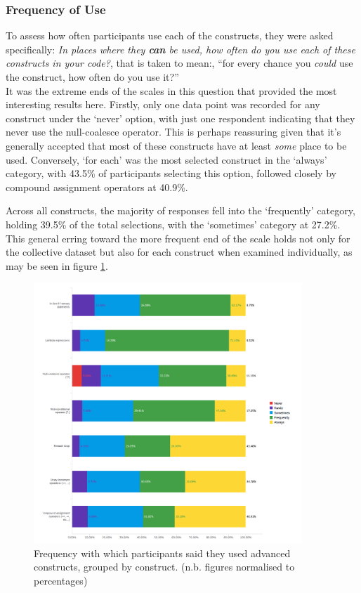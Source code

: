 \documentclass{article}
\begin{document}
        \subsubsection{Frequency of Use}
            To assess how often participants use each of the constructs, they were asked specifically: \textit{In places where they \textbf{can} be used, how often do you use each of these constructs in your code?}, that is taken to mean:, ``for every chance you \emph{could} use the construct, how often do you use it?''
            \\\newline
            It was the extreme ends of the scales in this question that provided the most interesting results here. Firstly, only one data point was recorded for any construct under the `never' option, with just one respondent indicating that they never use the null-coalesce operator. This is perhaps reassuring given that it's generally accepted that most of these constructs have at least \emph{some} place to be used. Conversely, `for each' was the most selected construct in the `always' category, with 43.5\% of participants selecting this option, followed closely by compound assignment operators at 40.9\%.

            Across all constructs, the majority of responses fell into the `frequently' category, holding 39.5\% of the total selections, with the `sometimes' category at 27.2\%. This general erring toward the more frequent end of the scale holds not only for the collective dataset but also for each construct when examined individually, as may be seen in figure \ref{fig:freqUse}.

            \begin{figure}[htbp]
                \centering
                \includegraphics[width=0.9\textwidth]{freqUse}
                \caption{Frequency with which participants said they used advanced constructs, grouped by construct. (n.b. figures normalised to percentages)}
                \label{fig:freqUse}
            \end{figure}
\end{document}
